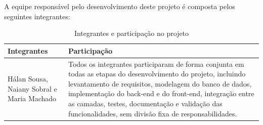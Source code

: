 A equipe responsável pelo desenvolvimento deste projeto é composta pelos seguintes integrantes:

\begin{table}[h!]
\centering
\caption{Integrantes e participação no projeto}
\label{tab:equipe}
\begin{tabularx}{\textwidth}{|l|X|}
\hline
\textbf{Integrantes} & \textbf{Participação} \\
\hline
Hálan Sousa, Naiany Sobral e Maria Machado &
Todos os integrantes participaram de forma conjunta em todas as etapas do desenvolvimento do projeto, incluindo levantamento de requisitos, modelagem do banco de dados, implementação do back-end e do front-end, integração entre as camadas, testes, documentação e validação das funcionalidades, sem divisão fixa de responsabilidades. \\
\hline
\end{tabularx}
\end{table}

